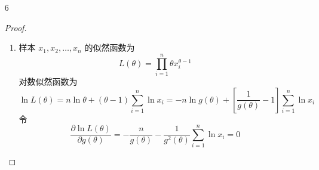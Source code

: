 \documentclass[normal,founder,mtpro2,cn]{elegantnote}
\begin{document}
\begin{enumerate}
\begin{proof}
\begin{equation*}
\begin{aligned}
                    =                                                        & \int_{-\infty}^{+\infty}\frac{\partial^{2}\ln p\left(x;\theta\right)}{\partial\theta^{2}}\cdot p\left(x;\theta\right)\,\mathrm{d}x+\int_{-\infty}^{+\infty}\left[\frac{\partial\ln p\left(x;\theta\right)}{\partial\theta}\right]^{2}\cdot p\left(x;\theta\right)\,\mathrm{d}x \\
                    =                                                        & E\left[\frac{\partial^{2}\ln p\left(x;\theta\right)}{\partial\theta^{2}}\right]+E\left(S_{\theta}^{2}\right)                                                                                                                                                                   \\
                    =                                                        & E\left[\frac{\partial^{2}\ln p\left(x;\theta\right)}{\partial\theta^{2}}\right]+I\left(\theta\right)=0
                \end{aligned}
            \end{equation*}
            故，
            \begin{equation*}
                I\left(\theta\right)=-E\left[\frac{\partial^{2}\ln p\left(x;\theta\right)}{\partial\theta^{2}}\right]
            \end{equation*}
        \end{proof}
    \item[6]
        \begin{proof}
            \begin{enumerate}
                \item 样本 $x_{1},x_{2},\ldots,x_{n}$ 的似然函数为
                      \begin{equation*}
                          L\left(\theta\right)=\prod_{i=1}^{n}\theta x_{i}^{\theta-1}
                      \end{equation*}
                      对数似然函数为
                      \begin{equation*}
                          \ln L\left(\theta\right)=n\ln\theta+\left(\theta-1\right)\sum_{i=1}^{n}\ln x_{i}=-n\ln g\left(\theta\right)+\left[\frac{1}{g\left(\theta\right)}-1\right]\sum_{i=1}^{n}\ln x_{i}
                      \end{equation*}
                      令
                      \begin{equation*}
                          \frac{\partial\ln L\left(\theta\right)}{\partial g\left(\theta\right)}=-\frac{n}{g\left(\theta\right)}-\frac{1}{g^{2}\left(\theta\right)}\sum_{i=1}^{n}\ln x_{i}=0

\end{equation*}
\end{enumerate}
\end{proof}
\end{enumerate}
\end{document}
